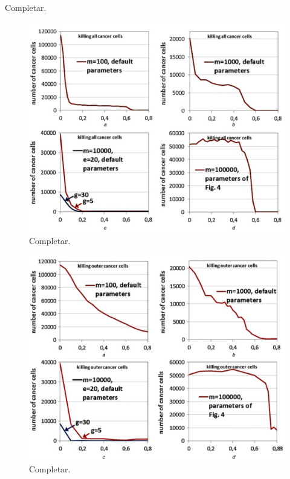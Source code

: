 Completar.

\begin{figure}[h]
\centering
\includegraphics[scale=0.7]{figures/experiments/exp7}
\caption{Completar.}
\label{fig:exp7}
\end{figure}

\begin{figure}[h]
\centering
\includegraphics[scale=0.7]{figures/experiments/exp8}
\caption{Completar.}
\label{fig:exp8}
\end{figure}

